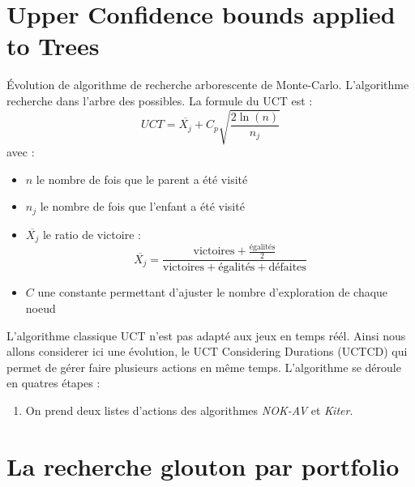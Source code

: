 \documentclass[a4paper, 11pt]{article}
\theoremstyle{definition}
\begin{document}
\section{Upper Confidence bounds applied to Trees}
Évolution de algorithme de recherche arborescente de Monte-Carlo.
L'algorithme recherche dans l'arbre des possibles. La formule du UCT est :
$$UCT = \overline{X_j} + C_p \sqrt{\frac{2 \ln(n)}{n_j}} $$ 
avec :
\begin{itemize}
    \item $n$ le nombre de fois que le parent a été visité
    \item $n_j$ le nombre de fois que l'enfant a été visité
    \item $\overline{X_j}$ le ratio de victoire : $$\overline{X_j} = \frac{\text{victoires} + \frac{\text{égalités}}{2}}{\text{victoires} + \text{égalités} + \text{défaites}}$$
    \item $C$ une constante permettant d'ajuster le nombre d'exploration de chaque noeud
\end{itemize}
L'algorithme classique UCT n'est pas adapté aux jeux en temps réél. Ainsi nous 
allons considerer ici une évolution, le UCT Considering Durations (UCTCD) qui 
permet de gérer faire plusieurs actions en même temps. 
L'algorithme se déroule en quatres étapes :
\begin{enumerate}
    \item On prend deux listes d'actions des algorithmes \emph{NOK-AV} et \emph{Kiter}.
\end{enumerate}

\section{La recherche glouton par portfolio}
\begin{lstlisting}
\end{lstlisting}
\end{document}
